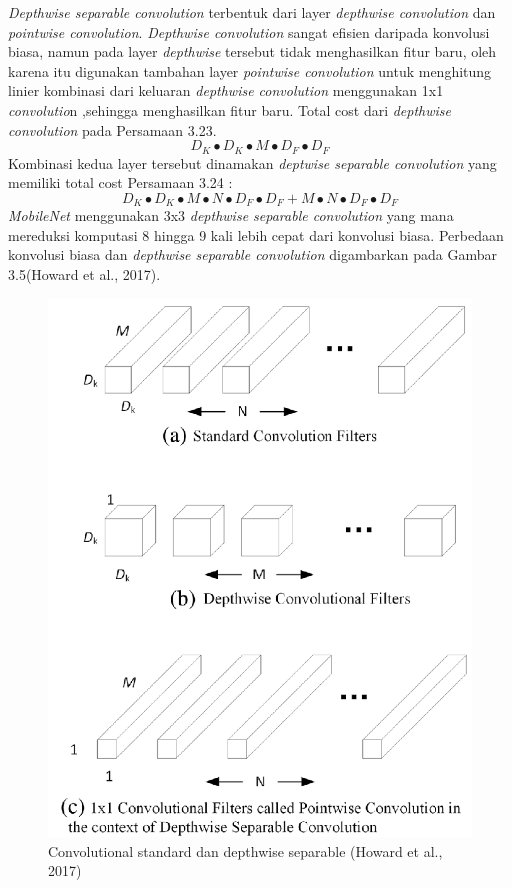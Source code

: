 \emph{Depthwise separable convolution} terbentuk dari layer \emph{depthwise convolution} dan \emph{pointwise convolution}. \emph{Depthwise convolution} sangat efisien daripada konvolusi biasa, namun pada layer \emph{depthwise} tersebut tidak menghasilkan fitur baru, oleh karena itu digunakan tambahan layer \emph{pointwise convolution} untuk menghitung linier kombinasi dari keluaran \emph{depthwise convolution} menggunakan 1x1 \emph{convolutio}n ,sehingga menghasilkan fitur baru. Total cost dari \emph{depthwise convolution} pada Persamaan 3.23.
\begin{equation}
D_K \bullet D_K \bullet M \bullet D_F \bullet D_F
\end{equation}
Kombinasi kedua layer tersebut dinamakan \emph{deptwise separable convolution} yang memiliki total cost Persamaan 3.24 :
\begin{equation}
D_K \bullet D_K \bullet M \bullet N \bullet D_F \bullet D_F + M \bullet N \bullet D_F \bullet D_F
\end{equation}
\emph{MobileNet} menggunakan 3x3 \emph{depthwise separable convolution} yang mana mereduksi komputasi 8 hingga 9 kali lebih cepat dari konvolusi biasa. Perbedaan konvolusi biasa dan \emph{depthwise separable convolution} digambarkan pada Gambar 3.5(Howard et al., 2017).
\begin{figure}[H]
	\centering
	\includegraphics[width=0.5\linewidth]{"new"}
	\caption{Convolutional standard dan depthwise separable (Howard et al., 2017)}
	\label{fig:new}
\end{figure} 
